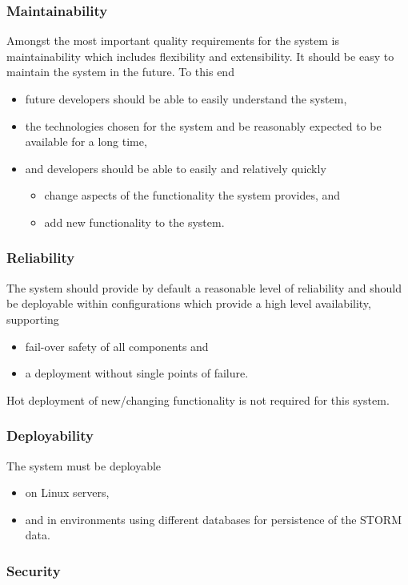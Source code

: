 \subsubsection{Maintainability} 
Amongst the most important quality requirements for the system is maintainability which includes flexibility and extensibility. It should be easy to maintain the system in the future. To this end
\begin{itemize}
\item future developers should be able to easily understand the system,
\item the technologies chosen for the system and be reasonably expected to be available for a long time,
\item and developers should be able to easily and relatively quickly
\begin{itemize}
\item change aspects of the functionality the system provides, and
\item add new functionality to the system.
\end{itemize}
\end{itemize}

\subsubsection{Reliability}
The system should provide by default a reasonable level of reliability and should be deployable within configurations which provide a high level availability, supporting
\begin{itemize}
\item fail-over safety of all components and
\item a deployment without single points of failure.
\end{itemize}
Hot deployment of new/changing functionality is not required for this system.

\subsubsection{Deployability}
The system must be deployable
\begin{itemize}
\item on Linux servers,
\item and in environments using different databases for persistence of the STORM data.
\end{itemize}

\subsubsection{Security}
